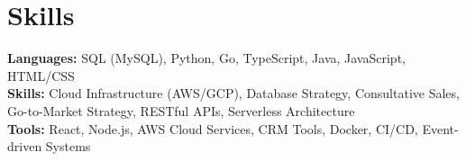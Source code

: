 \documentclass[11pt]{article}       %
\begin{document}
\vspace{-18.5pt}


\section*{Skills}
\textbf{Languages:} SQL (MySQL), Python, Go, TypeScript, Java, JavaScript, HTML/CSS\\
\textbf{Skills:} Cloud Infrastructure (AWS/GCP), Database Strategy, Consultative Sales, Go-to-Market Strategy, RESTful APIs, Serverless Architecture\\
\textbf{Tools:} React, Node.js, AWS Cloud Services, CRM Tools, Docker, CI/CD, Event-driven Systems\\

\vspace{-6.5pt}
\end{document}
